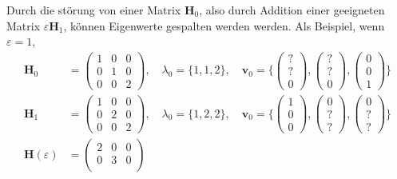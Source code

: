 Durch die störung von einer Matrix $\bm H_0$, also durch Addition einer geeigneten Matrix $\varepsilon \bm H_1$, können Eigenwerte gespalten werden werden.
Als Beispiel, wenn $\varepsilon = 1$, 
\begin{align}
    \bm H_0 &= 
    \begin{pmatrix}
        1 & 0 & 0\\
        0 & 1 & 0\\
        0 & 0 & 2
    \end{pmatrix},
    \quad
    \lambda_0 = \{1, 1, 2\},
    \quad
    \bm v_0 = \{
    \begin{pmatrix}
        ?\\
        ?\\
        0
    \end{pmatrix},
    \begin{pmatrix}
        ?\\
        ?\\
        0
    \end{pmatrix},
    \begin{pmatrix}
        0\\
        0\\
        1
    \end{pmatrix}
    \}
    \\
    \bm H_1 &= 
    \begin{pmatrix}
        1 & 0 & 0\\
        0 & 2 & 0\\
        0 & 0 & 2
    \end{pmatrix},
    \quad
    \lambda_0 = \{1, 2, 2\},
    \quad
    \bm v_0 = \{
    \begin{pmatrix}
        1\\
        0\\
        0
    \end{pmatrix},
    \begin{pmatrix}
        0\\
        ?\\
        ?
    \end{pmatrix},
    \begin{pmatrix}
        0\\
        ?\\
        ?
    \end{pmatrix}
    \}
    \\
    \bm H(\varepsilon) &= 
    \begin{pmatrix}
        2 & 0 & 0\\
        0 & 3 & 0\\

\end{pmatrix}
\end{align}
